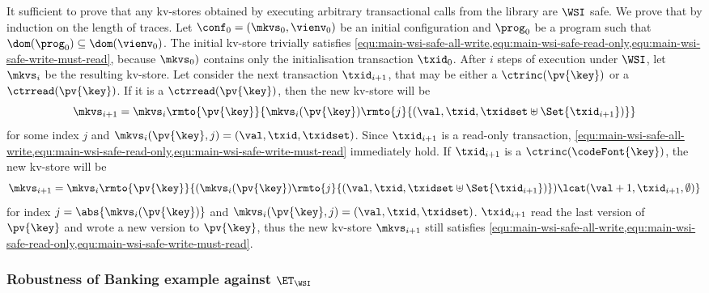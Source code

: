It sufficient to prove that any kv-stores obtained by executing arbitrary transactional calls from the library are \( \WSI \) safe.
We prove that by induction on the length of traces.
Let \( \conf_0 = (\mkvs_0, \vienv_0) \) be an initial configuration and \( \prog_0 \) be a program such that \( \dom(\prog_0) \subseteq \dom(\vienv_0) \).
The initial kv-store trivially satisfies \cref{equ:main-wsi-safe-all-write,equ:main-wsi-safe-read-only,equ:main-wsi-safe-write-must-read},
because \( \mkvs_0) \) contains only the initialisation transaction \( \txid_0 \).
After \( i \) steps of execution under \( \WSI \), let \( \mkvs_i \) be the resulting kv-store.
Let consider the next transaction \( \txid_{i+1} \), that may be either a \( \ctrinc(\pv{\key}) \) or a \( \ctrread(\pv{\key}) \).
If it is a \( \ctrread(\pv{\key}) \),
then the new kv-store will be
\[ \mkvs_{i+1} = \mkvs_{i}\rmto{\pv{\key}}{\mkvs_i(\pv{\key})\rmto{j}{(\val, \txid, \txidset \uplus \Set{\txid_{i+1}})}} \]
\noindent for some index \( j \) and \( \mkvs_i(\pv{\key},j) = (\val,\txid,\txidset)\).
Since \( \txid_{i+1} \) is a read-only transaction,
\cref{equ:main-wsi-safe-all-write,equ:main-wsi-safe-read-only,equ:main-wsi-safe-write-must-read} immediately hold.
If \( \txid_{i+1} \) is a \( \ctrinc(\codeFont{\key}) \), 
the new kv-store will be
\[
    \mkvs_{i+1} = \mkvs_{i}\rmto{\pv{\key}}{( \mkvs_i(\pv{\key})\rmto{j}{(\val, \txid, \txidset \uplus \Set{\txid_{i+1}})} ) \lcat (\val+1, \txid_{i+1}, \emptyset) } 
\]
\noindent for index \( j  = \abs{\mkvs_i(\pv{\key})} \) and \( \mkvs_i(\pv{\key},j) = (\val,\txid,\txidset)\).
\( \txid_{i+1} \) read the last version of \( \pv{\key} \) and wrote a new version to \( \pv{\key} \),
thus the new kv-store \( \mkvs_{i+1} \) still satisfies \cref{equ:main-wsi-safe-all-write,equ:main-wsi-safe-read-only,equ:main-wsi-safe-write-must-read}. 

\subsubsection{Robustness of Banking example against $\ET_{\WSI}$}

